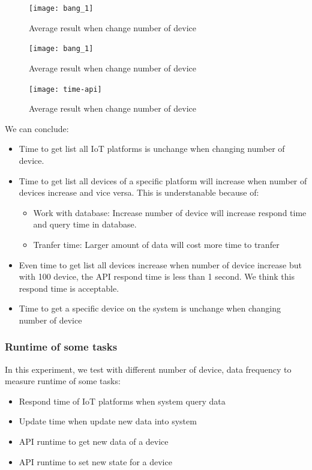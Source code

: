 \documentclass[runningheads,a4paper]{llncs}
\begin{document}
\begin{figure}[H]
\centering
\texttt{[image: bang\_1]} 
\caption{Average result when change number of device}
\end{figure} 

\begin{figure}[H]
\centering
\texttt{[image: bang\_1]} 
\caption{Average result when change number of device}
\end{figure} 




\begin{figure}[H]
\centering
\texttt{[image: time-api]} 
\caption{Average result when change number of device}
\end{figure} 

We can conclude: 

\begin{itemize}
\item Time to get list all IoT platforms is unchange when changing number of device.
\item Time to get list all devices of a specific platform will increase when number of devices increase and vice versa. This is understanable because of:
\begin{itemize}
\item Work with database: Increase number of device will increase respond time and query time in database.
\item Tranfer time: Larger amount of data will cost more time to tranfer
\end{itemize}

\item Even time to get list all devices increase when number of device increase but with 100 device, the API respond time is less than 1 second. We think this respond time is acceptable.
\item Time to get a specific device on the system is unchange when changing number of device
\end{itemize}


\subsubsection{Runtime of some tasks}

In this experiment, we test with different number of device, data frequency to measure runtime of some tasks:

\begin{itemize}
\item Respond time of IoT platforms when system query data
\item Update time when update new data into system
\item API runtime to get new data of a device
\item API runtime to set new state for a device
\end{itemize}
\end{document}
